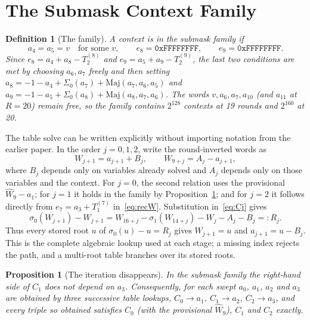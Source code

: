 \documentclass[11pt,a4paper]{article}
\newtheorem{definition}{Definition}
\newtheorem{proposition}{Proposition}
\newcommand{\Sig}[1]{\Sigma_{#1}}
\newcommand{\sig}[1]{\sigma_{#1}}
\newcommand{\Maj}{\mathrm{Maj}}
\newcommand{\hex}[1]{\texttt{#1}}
\begin{document}
\section{The Submask Context Family}
\label{sec:family}

\begin{definition}[The family]
A context is in the \emph{submask family} if
\[
a_4 = a_5 = v \quad\text{for some } v,\qquad e_8 = \hex{0xFFFFFFFF},\qquad
e_9 = \hex{0xFFFFFFFF}.
\]
Since $e_8 = a_4+a_8-T_2^{(8)}$ and $e_9=a_5+a_9-T_2^{(9)}$, the last two
conditions are met by choosing $a_6,a_7$ freely and then setting
$a_8 = -1-a_4+\Sig0(a_7)+\Maj(a_7,a_6,a_5)$ and
$a_9 = -1-a_5+\Sig0(a_8)+\Maj(a_8,a_7,a_6)$.  The words $v,a_6,a_7,a_{10}$
(and $a_{11}$ at $R=20$) remain free, so the family contains $2^{128}$
contexts at 19 rounds and $2^{160}$ at 20.
\end{definition}

The table solve can be written explicitly without importing notation from the
earlier paper.  In the order $j=0,1,2$, write the round-inverted words as
\begin{equation}
 W_{j+1}=a_{j+1}+B_j,\qquad W_{9+j}=A_j-a_{j+1},
 \label{eq:AB}
\end{equation}
where $B_j$ depends only on variables already solved and $A_j$ depends only on
those variables and the context.  For $j=0$, the second relation uses the
provisional $\hat W_9-a_1$; for $j=1$ it holds in the family by
Proposition~\ref{prop:triangular}; and for $j=2$ it follows directly from
$e_7=a_3+T_1^{(7)}$ in~\eqref{eq:recW}.  Substitution in~\eqref{eq:Cj} gives
\begin{equation}
 \sig0(W_{j+1})-W_{j+1}
 =W_{16+j}-\sig1(W_{14+j})-W_j-A_j-B_j=:R_j.
 \label{eq:lookupRHS}
\end{equation}
Thus every stored root $u$ of $\sig0(u)-u=R_j$ gives
$W_{j+1}=u$ and $a_{j+1}=u-B_j$.  This is the complete algebraic lookup used
at each stage; a missing index rejects the path, and a multi-root table
branches over its stored roots.

\begin{proposition}[The iteration disappears]
\label{prop:triangular}
In the submask family the right-hand side of $C_1$ does not depend on $a_3$.
Consequently, for each swept $a_0$, $a_1$, $a_2$ and $a_3$ are obtained by
three successive table lookups, $C_0\to a_1$, $C_1\to a_2$, $C_2\to a_3$, and
every triple so obtained satisfies $C_0$ (with the provisional $\hat W_9$),
$C_1$ and $C_2$ exactly.
\end{proposition}
\end{document}
